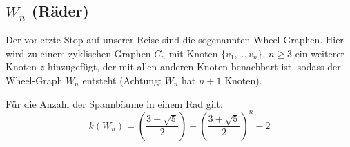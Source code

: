 \subsection{$W_n$ (Räder)}
Der vorletzte Stop auf unserer Reise sind die sogenannten Wheel-Graphen. Hier wird zu einem zyklischen Graphen $C_n$ mit Knoten $\{v_1,..,v_n\}$, $n \geq 3$ ein weiterer Knoten $z$ hinzugefügt, der mit allen anderen Knoten benachbart ist, sodass der Wheel-Graph $W_{n}$ entsteht (Achtung: $W_n$ hat $n+1$ Knoten).\\
\begin{Tm}
Für die Anzahl der Spannbäume in einem Rad gilt:
\begin{equation}
 \mathit{k}(W_n) = (\frac{3+\sqrt{5}}{2})+(\frac{3+\sqrt{5}}{2})^n-2
\end{equation}
\end{Tm}

